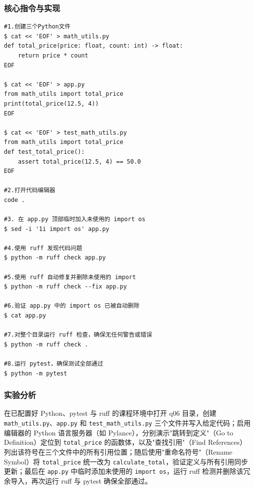 \documentclass[12pt,a4paper]{article}
\begin{document}
\subsubsection{核心指令与实现}
\begin{lstlisting}[caption={实验二关键 Shell 指令}]
#1.创建三个Python文件
$ cat << 'EOF' > math_utils.py
def total_price(price: float, count: int) -> float:
    return price * count
EOF

$ cat << 'EOF' > app.py
from math_utils import total_price
print(total_price(12.5, 4))
EOF

$ cat << 'EOF' > test_math_utils.py
from math_utils import total_price
def test_total_price():
    assert total_price(12.5, 4) == 50.0
EOF

#2.打开代码编辑器
code .

#3. 在 app.py 顶部临时加入未使用的 import os
$ sed -i '1i import os' app.py

#4.使用 ruff 发现代码问题
$ python -m ruff check app.py

#5.使用 ruff 自动修复并删除未使用的 import
$ python -m ruff check --fix app.py

#6.验证 app.py 中的 import os 已被自动删除
$ cat app.py

#7.对整个目录运行 ruff 检查，确保无任何警告或错误
$ python -m ruff check .

#8.运行 pytest，确保测试全部通过
$ python -m pytest
\end{lstlisting}

\subsubsection{实验分析}
\begin{infobox}[实现思路]
在已配置好 Python、pytest 与 ruff 的课程环境中打开 q06 目录，创建 \texttt{math\_utils.py}、\texttt{app.py} 和 \texttt{test\_math\_utils.py} 三个文件并写入给定代码；启用编辑器的 Python 语言服务器（如 Pylance），分别演示"跳转到定义"（Go to Definition）定位到 \texttt{total\_price} 的函数体，以及"查找引用"（Find References）列出该符号在三个文件中的所有引用位置；随后使用"重命名符号"（Rename Symbol）将 \texttt{total\_price} 统一改为 \texttt{calculate\_total}，验证定义与所有引用同步更新；最后在 \texttt{app.py} 中临时添加未使用的 \texttt{import os}，运行 ruff 检测并删除该冗余导入，再次运行 ruff 与 pytest 确保全部通过。
\end{infobox}
\end{document}
